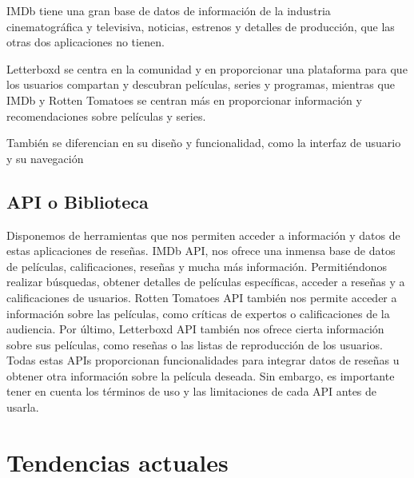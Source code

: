 IMDb tiene una gran base de datos de información de la industria cinematográfica y televisiva, 
noticias, estrenos y detalles de producción, que las otras dos aplicaciones no tienen.

Letterboxd se centra en la comunidad y en proporcionar una plataforma para que los usuarios compartan 
y descubran películas, series y programas, mientras que IMDb y Rotten Tomatoes se centran más en 
proporcionar información y recomendaciones sobre películas y series.

También se diferencian en su diseño y funcionalidad, como la interfaz de usuario y su navegación

\subsection{API o Biblioteca}

Disponemos de herramientas que nos permiten acceder a información y datos de estas aplicaciones de 
reseñas. IMDb API, nos ofrece una inmensa base de datos de películas, calificaciones, reseñas y mucha 
más información. Permitiéndonos realizar búsquedas, obtener detalles de películas específicas, acceder 
a reseñas y a calificaciones de usuarios. Rotten Tomatoes API también nos permite acceder a 
información sobre las películas, como críticas de expertos o calificaciones de la audiencia. Por 
último, Letterboxd API también nos ofrece cierta información sobre sus películas, como reseñas o las 
listas de reproducción de los usuarios. Todas estas APIs proporcionan funcionalidades para integrar 
datos de reseñas u obtener otra información sobre la película deseada. Sin embargo, es importante 
tener en cuenta los términos de uso y las limitaciones de cada API antes de usarla.

\section{Tendencias actuales}

